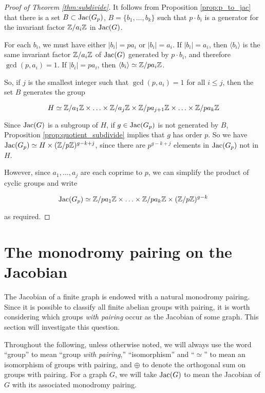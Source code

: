 \documentclass{amsart}
\begin{document}
\begin{proof}[Proof of Theorem \ref{thm:subdivide}]
  It follows from Proposition \ref{prop:p_to_jac} that there is a set
  $B \subset \operatorname{Jac}(G_p)$, $B = \{b_1, \ldots, b_k\}$ such that $p \cdot
  b_i$ is a generator for the invariant factor $\mathbb{Z}/a_i\mathbb{Z}$ in
  $\operatorname{Jac}(G)$.

  For each $b_i$, we must have either $|b_i| = pa_i$ or $|b_i| =
  a_i$. If $|b_i| = a_i$, then $\langle b_i \rangle$ is the same
  invariant factor $\mathbb{Z}/a_i\mathbb{Z}$ of $\operatorname{Jac}(G)$ generated by $p \cdot b_i$,
  and therefore $\gcd(p, a_i) = 1$. If $|b_i| = pa_i$, then $\langle
  b_i \rangle \simeq \mathbb{Z}/pa_i\mathbb{Z}$.

  So, if $j$ is the smallest integer such that $\gcd(p, a_i) = 1$ for
  all $i \le j$, then the set $B$ generates the group

  $$H \simeq \mathbb{Z}/a_1\mathbb{Z} \times \ldots \times \mathbb{Z}/a_j\mathbb{Z} 
  \times \mathbb{Z}/pa_{j+1}\mathbb{Z} \times \ldots \times \mathbb{Z}/pa_k\mathbb{Z}$$

  Since $\operatorname{Jac}(G)$ is a subgroup of $H$, if $g \in \operatorname{Jac}(G_p)$ is not
  generated by $B$, Proposition \ref{prop:quotient_subdivide} implies
  that $g$ has order $p$. So we have $\operatorname{Jac}(G_p) \simeq H \times
  (\mathbb{Z}/p\mathbb{Z})^{g-k+j}$, since there are $p^{g-k+j}$ elements in
  $\operatorname{Jac}(G_p)$ not in $H$.

  However, since $a_1, \ldots, a_j$ are each coprime to $p$, we can
  simplify the product of cyclic groups and write

\begin{equation*}
  \operatorname{Jac}(G_p) \simeq \mathbb{Z}/pa_1\mathbb{Z} \times 
  \ldots \times \mathbb{Z}/pa_k\mathbb{Z} \times (\mathbb{Z}/p\mathbb{Z})^{g-k}
\end{equation*}

as required.
\end{proof}

\section{The monodromy pairing on the Jacobian}


The Jacobian of a finite graph is endowed with a natural monodromy
pairing. Since it is possible to classify all finite abelian groups
with pairing, it is worth considering which groups \emph{with pairing}
occur as the Jacobian of some graph. This section will investigate
this question.

\begin{note}
  Throughout the following, unless otherwise noted, we will always use
  the word ``group'' to mean ``group \emph{with pairing},''
  ``isomorphism'' and ``$\simeq$'' to mean an isomorphism of groups
  with pairing, and $\oplus$ to denote the orthogonal sum on groups
  with pairing. For a graph $G$, we will take $\operatorname{Jac}(G)$ to mean the
  Jacobian of $G$ with its associated monodromy pairing.
\end{note}
\end{document}

